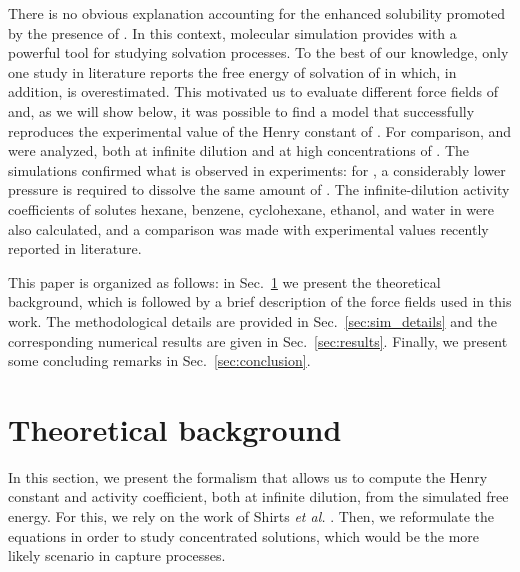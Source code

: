 \documentclass[3p,twocolumn]{elsarticle}
\begin{document}
There is no obvious explanation accounting for the enhanced solubility promoted by the presence of \ce{[B(CN)_4]^-}.
In this context, molecular simulation provides with a powerful tool for studying solvation processes.
To the best of our knowledge, only one study in literature reports the free energy of solvation of  in \ce{[emim][B(CN)_4]} \cite{Liu_2014_1} which, in addition, is overestimated.
This motivated us to evaluate different force fields of \ce{[emim][B(CN)_4]} and, as we will show below, it was possible to find a model that successfully reproduces the experimental value of the Henry constant of .
For comparison, \ce{[emim][B(CN)_4]} and \ce{[emim][NTf_2]} were analyzed, both at infinite dilution and at high concentrations of .
The simulations confirmed what is observed in experiments: for \ce{[emim][B(CN)_4]}, a considerably lower pressure is required to dissolve the same amount of .
The infinite-dilution activity coefficients of solutes hexane, benzene, cyclohexane, ethanol, and water in \ce{[emim][B(CN)_4]} were also calculated, and a comparison was made with experimental values recently reported in literature.

This paper is organized as follows: in Sec.~\ref{sec:theory} we present the theoretical background, which is followed by a brief description of the force fields used in this work.
The methodological details are provided in Sec.~\ref{sec:sim_details} and the corresponding numerical results are given in Sec.~\ref{sec:results}.
Finally, we present some concluding remarks in Sec.~\ref{sec:conclusion}.

\section{Theoretical background}
\label{sec:theory}

In this section, we present the formalism that allows us to compute the Henry constant and activity coefficient, both at infinite dilution, from the simulated free energy.
For this, we rely on the work of Shirts \textit{et al.} \cite{Shirts_2003}.
Then, we reformulate the equations in order to study concentrated solutions, which would be the more likely scenario in  capture processes.
\end{document}
